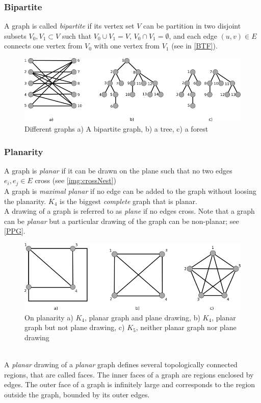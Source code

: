 \subsubsection{Bipartite}
A graph is called \textit{bipartite} if its vertex set $V$ can be partition in two disjoint subsets $V_0, V_1 \subset V$ such that $V_0 \cup V_1 = V$, $V_0 \cap V_1 = \emptyset$, and each edge $(u,v) \in E$ connects one vertex from $V_0$ with one vertex from $V_1$ (see in \autoref{BTF}).\\

\begin{figure}[h!]
\begin{center}
\includegraphics[width= \textwidth]{figures/BipartiteTreeForest.png}
\caption{Different graphs a) A bipartite graph, b) a tree, c) a forest}
\label{BTF}
\end{center}
\end{figure}

\subsubsection{Planarity}
A graph is \textit{planar} if it can be drawn on the plane such that no two edges $e_i, e_j \in E$ cross (see \autoref{img:crossNest}) \\
A graph is \textit{maximal planar} if no edge can be added to the graph without loosing the planarity. $K_4$ is the biggest \textit{complete} graph that is planar.\\
A drawing of a graph is referred to as \textit{plane} if no edges cross. Note that a graph can be \textit{planar} but a particular drawing of the graph can be non-planar; see \autoref{PPG}.
\begin{figure}[h!]
\includegraphics[width =\textwidth]{figures/PlanarPlaneGraphs.png}
\caption{On planarity a) $K_4$, planar graph and plane drawing, b) $K_4$, planar graph but not plane drawing, c) $K_5$, neither planar graph nor plane drawing}
\label{PPG}
\end{figure}\\
A \textit{planar} drawing of a \textit{planar} graph defines several topologically connected regions, that are called faces. The inner faces of a graph are regions enclosed by edges. The outer face of a graph is infinitely large and corresponds to the region outside the graph, bounded by its outer edges.
